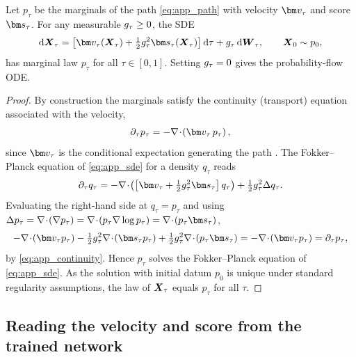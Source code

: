 \begin{proposition}\label{prop:marginal_preservation}
Let $p_\tau$ be the marginals of the path \eqref{eq:app_path} with velocity $\fmvel_\tau$ and score $\genscore_\tau$. For any measurable $g_\tau\ge0$, the SDE
\begin{align}\label{eq:app_sde}
    \rd\bX_\tau = \left[\fmvel_\tau(\bX_\tau) + \tfrac12\gdiff_\tau^2\genscore_\tau(\bX_\tau)\right]\rd\tau + \gdiff_\tau\,\rd\bW_\tau,
    \qquad \bX_0\sim p_0,
\end{align}
has marginal law $p_\tau$ for all $\tau\in[0,1]$. Setting $g_\tau=0$ gives the probability-flow ODE.
\end{proposition}
\begin{proof}
By construction the marginals satisfy the continuity (transport) equation associated with the velocity,
\begin{align}\label{eq:app_continuity}
    \partial_\tau p_\tau = -\nabla\!\cdot\!\left(\fmvel_\tau\,p_\tau\right),
\end{align}
since $\fmvel_\tau$ is the conditional expectation generating the path \cite{lipman_flow_2023, albergo_stochastic_2023}. The Fokker--Planck equation of \eqref{eq:app_sde} for a density $q_\tau$ reads
\begin{align}
    \partial_\tau q_\tau
    = -\nabla\!\cdot\!\left(\left[\fmvel_\tau + \tfrac12\gdiff_\tau^2\genscore_\tau\right]q_\tau\right)
    + \tfrac12\gdiff_\tau^2\Delta q_\tau .
\end{align}
Evaluating the right-hand side at $q_\tau=p_\tau$ and using $\Delta p_\tau = \nabla\!\cdot\!(\nabla p_\tau) = \nabla\!\cdot\!(p_\tau\nabla\log p_\tau) = \nabla\!\cdot\!(p_\tau\genscore_\tau)$,
\begin{align}
    -\nabla\!\cdot\!\left(\fmvel_\tau p_\tau\right)
    - \tfrac12\gdiff_\tau^2\nabla\!\cdot\!\left(\genscore_\tau p_\tau\right)
    + \tfrac12\gdiff_\tau^2\nabla\!\cdot\!\left(p_\tau\genscore_\tau\right)
    = -\nabla\!\cdot\!\left(\fmvel_\tau p_\tau\right)
    = \partial_\tau p_\tau,
\end{align}
by \eqref{eq:app_continuity}. Hence $p_\tau$ solves the Fokker--Planck equation of \eqref{eq:app_sde}. As the solution with initial datum $p_0$ is unique under standard regularity assumptions, the law of $\boldsymbol{X}_\tau$ equals $p_\tau$ for all $\tau$.
\end{proof}

\subsection{Reading the velocity and score from the trained network}
\label{appendix:score_reading}

